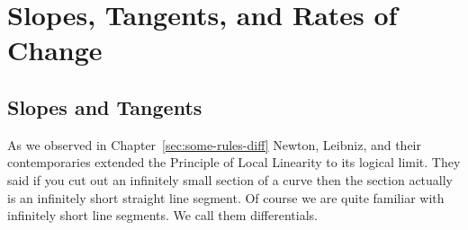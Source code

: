 \chapter{Slopes, Tangents, and Rates of Change}
\label{sec:veloc-slop-tang}


\section{Slopes and Tangents}
\label{sec:slopes-tangents}


As we observed in Chapter~\ref{sec:some-rules-diff} Newton, Leibniz,
and their contemporaries extended the Principle of Local Linearity to
its logical limit. They said if you cut out an infinitely small
section of a curve then the section actually is an infinitely short
straight line segment. Of course we are quite familiar with infinitely
short line segments. We call them differentials.

